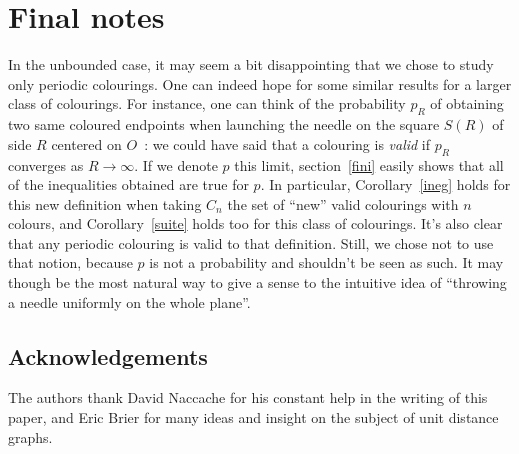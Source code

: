 \documentclass[a4paper,11pt]{article}
\theoremstyle{definition}
\theoremstyle{remark}
\begin{document}
\section{Final notes}
In the unbounded case, it may seem a bit disappointing that we chose to study 
only periodic colourings. One can indeed hope for some similar results for a 
larger class of colourings. For instance, one can think of the probability $p_R$ 
of obtaining two same coloured endpoints when launching the needle on the square 
$S(R)$ of side $R$ centered on $O$~: we could have said that a colouring is 
\emph{valid} if $p_R$ converges 
as $R \rightarrow \infty$. If we denote $p$ this limit, section~\ref{fini} 
easily shows that all of the inequalities obtained are true for $p$. In 
particular, Corollary~\ref{ineg} holds for this new definition when taking $C_n$ 
the set of ``new'' valid colourings with $n$ colours, and Corollary~\ref{suite} 
holds too for this class of colourings. 
It's also clear that any periodic colouring is valid to that 
definition. Still, we chose not to use that notion, because $p$ is not a 
probability and shouldn't be 
seen as such. It may though be the most natural way to give a sense to 
the intuitive idea of ``throwing a needle uniformly on the whole plane''.

\subsection*{Acknowledgements}
The authors thank David Naccache for his constant help in the writing of
this paper, and Eric Brier for many ideas and insight on the subject of 
unit distance graphs.
\end{document}
